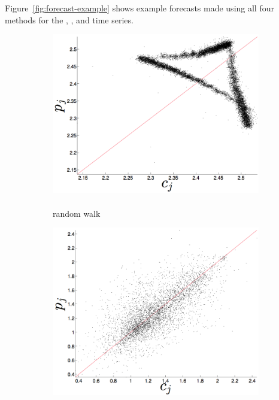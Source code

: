 Figure~\ref{fig:forecast-example} shows example forecasts made using
all four methods for the \col, \gcc, and \svdfive time series.
\begin{figure}[htbp]
  \centering
  
  \begin{subfigure}{0.6\columnwidth}
    \includegraphics[width=\columnwidth]{figs/colRWForecast.png}
    \caption{\col\\ random walk }
    \label{fig:gccMEAN}
  \end{subfigure}%
   \begin{subfigure}{0.6\columnwidth}
    \includegraphics[width=\columnwidth]{figs/gccRWForecast.png}

\end{subfigure}
\end{figure}
